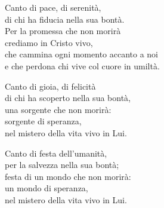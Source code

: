 
\strofa Canto di pace, di serenità,\\
di chi ha fiducia nella sua bontà.\\
Per la promessa che non morirà\\
crediamo in Cristo vivo,\\
che cammina ogni momento accanto a noi\\
e che perdona chi vive col cuore in umiltà.

\spazio

\strofa Canto di gioia, di felicità\\
di chi ha scoperto nella sua bontà,\\
una sorgente che non morirà:\\
sorgente di speranza,\\
nel mistero della vita vivo in Lui.

\spazio


\spazio


\spazio

\strofa Canto di festa dell'umanità,\\
per la salvezza nella sua bontà;\\
festa di un mondo che non morirà:\\
un mondo di speranza,\\
nel mistero della vita vivo in Lui.

\spazio


